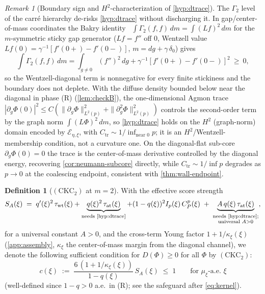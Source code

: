 \documentclass[reqno,final,11pt]{amsart}
\theoremstyle{plain}
\theoremstyle{definition}
\newtheorem{definition}[theorem]{Definition}
\theoremstyle{remark}
\newtheorem{remark}[theorem]{Remark}
\newcommand{\CKC}{(\mathrm{CKC}_{2})}
\begin{document}
\begin{remark}[Boundary sign and $H^2$-characterization of \cref{hyp:dtrace}]\label{rem:dtrace-gamma2}
The $\Gamma_2$ level of the carr\'e hierarchy de-risks \cref{hyp:dtrace} without
discharging it. In gap/center-of-mass coordinates the Bakry
identity~\citep{BGL}
$\int\Gamma_2(f,f)\,dm=\int(Lf)^2\,dm$ for the $m$-symmetric sticky gap generator
($Lf=f''$ off $0$, Wentzell value $Lf(0)=\gamma^{-1}[f'(0{+})-f'(0{-})]$,
$m=dg+\gamma\,\delta_0$) gives
\[
  \int\Gamma_2(f,f)\,dm=\int_{g\neq0}(f'')^2\,dg+\gamma^{-1}[f'(0{+})-f'(0{-})]^2\ \ge\ 0 ,
\]
so the Wentzell-diagonal term is nonnegative for every finite stickiness and the
boundary does not deplete. With the diffuse density bounded below near the
diagonal in phase (R) (\cref{lem:checkB}), the one-dimensional Agmon trace
$|\partial_g\Phi(0)|^2\le C(\|\partial_g\Phi\|_{L^2(p)}^2+\|\partial_g^2\Phi\|_{L^2(p)}^2)$
controls the second-order term by the graph norm $\int(L\Phi)^2\,dm$, so
\cref{hyp:dtrace} holds on the $H^2$ (graph-norm) domain encoded by
$\mathcal E_{\eta,\xi}$, with $C_{\mathrm{tr}}\sim1/\inf_{\text{near }0}p$; it is
an $H^2$/Wentzell-membership condition, not a curvature one. On the diagonal-flat
sub-core $\partial_g\Phi(0)=0$ the trace is the center-of-mass derivative
controlled by the diagonal energy, recovering \cref{cor:neumann-subcore}
directly, while $C_{\mathrm{tr}}\sim1/\inf p$ degrades as $p\to0$ at the
coalescing endpoint, consistent with \cref{thm:wall-endpoint}.
\end{remark}

\begin{definition}[$\CKC$ at $m=2$]\label{def:ckc}
With the effective score strength
\begin{equation}\label{eq:S}
  S_A(\xi)\;=\;q'(\xi)^2\,\tau_{\mathrm{wt}}(\xi)
   +\underbrace{q(\xi)^2\,\tau_{\mathrm{at}}(\xi)}_{\textnormal{needs \cref{hyp:dtrace}}}
   +(1-q(\xi))^2 I_p(\xi)\,C^p_P(\xi)
   \;+\;\underbrace{A\,q(\xi)\,\tau_{\mathrm{at}}(\xi)}_{\substack{\textnormal{needs \cref{hyp:dtrace};}\\ \textnormal{universal }A>0}},
\end{equation}
for a universal constant $A>0$, and the cross-term Young factor
$1+1/\kappa_\xi(\xi)$ (\cref{app:assembly}, $\kappa_\xi$ the center-of-mass
margin from the diagonal channel), we denote the following sufficient condition
for $D(\Phi)\ge0$ for all $\Phi$ by $\CKC$:
\begin{equation}\label{eq:ckc}
  c(\xi)\;:=\;\frac{6\,(1+1/\kappa_\xi(\xi))}{1-q(\xi)}\,S_A(\xi)\;\le\;1
  \qquad\text{for }\mu_\xi\text{-a.e. }\xi
\end{equation}
(well-defined since $1-q>0$ a.e.\ in (R); see the safeguard after
\eqref{eq:kernel}).
\end{definition}
\end{document}
